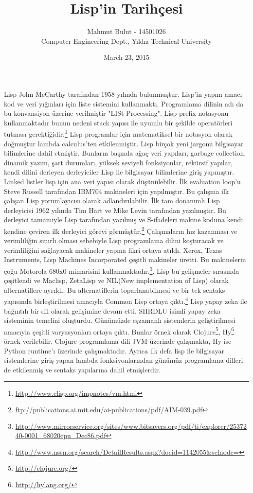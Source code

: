 \documentclass[12pt]{article}
\begin{document}
\title{ Lisp'in Tarihçesi }
\date{March 23, 2015}
\author{Mahmut Bulut - 14501026\\ Computer Engineering Dept., Yıldız Technical University}

\maketitle

Lisp John McCarthy tarafından 1958 yılında bulunmuştur. Lisp'in yapım amacı kod ve veri yığınları için liste sistemini kullanmaktı. Programlama dilinin adı da bu konvansiyon üzerine verilmiştir "LISt Processing". Lisp prefix notasyonu kullanmaktadır bunun nedeni stack yapısı ile uyumlu bir şekilde operatörleri tutması gerektiğidir.\footnote{\url{http://www.clisp.org/impnotes/vm.html}} Lisp programlar için matematiksel bir notasyon olarak doğmuştur lambda calculus'ten etkilenmiştir. Lisp birçok yeni jargonu bilgisayar bilimlerine dahil etmiştir. Bunların başında ağaç veri yapıları, garbage collection, dinamik yazım, şart durumları, yüksek seviyeli fonksiyonlar, rekürsif yapılar, kendi dilini derleyen derleyiciler Lisp ile bilgisayar bilimlerine giriş yapmıştır. Linked listler lisp için ana veri yapısı olarak düşünülebilir. İlk evaluation loop'u Steve Russell tarafından IBM704 makineleri için yapılmıştır. Bu çalışma ilk çalışan Lisp yorumlayıcısı olarak adlandırılabilir. İlk tam donanımlı Lisp derleyicisi 1962 yılında Tim Hart ve Mike Levin tarafından yazılmıştır. Bu derleyici tamamıyle Lisp tarafından yazılmış ve S-ifadeleri makine koduna kendi kendine çeviren ilk derleyici görevi görmüştür.\footnote{\url{ftp://publications.ai.mit.edu/ai-publications/pdf/AIM-039.pdf}} Çalışmaların hız kazanması ve verimliliğin sınırlı olması sebebiyle Lisp programlama dilini koşturacak ve verimliliğini sağlayacak makineler yapma fikri ortaya atıldı. Xerox, Texas Instruments, Lisp Machines Incorporated çeşitli makineler üretti. Bu makinelerin çoğu Motorola 680x0 mimarisini kullanmaktadır.\footnote{\url{http://www.mirrorservice.org/sites/www.bitsavers.org/pdf/ti/explorer/2537240-0001_68020cpu_Dec86.pdf}}. Lisp bu gelişmeler sırasında çeşitlendi ve Maclisp, ZetaLisp ve NIL(New implementation of Lisp) olarak alternatiflere ayrıldı. Bu alternatiflerin toparlanabilmesi ve bir tek sentaks yapısında birleştirilmesi amacıyla Common Lisp ortaya çıktı.\footnote{\url{http://www.nssn.org/search/DetailResults.aspx?docid=1142055&selnode=}} Lisp yapay zeka ile bağıntılı bir dil olarak gelişimine devam etti. SHRDLU isimli yapay zeka sisteminin temelini oluşturdu. Günümüzde eşzamanlı sistemlerin geliştirilmesi amacıyla çeşitli varyasyonları ortaya çıktı. Bunlar örnek olarak Clojure\footnote{\url{http://clojure.org/}}, Hy\footnote{\url{http://hylang.org/}} örnek verilebilir. Clojure programlama dili JVM üzerinde çalışmakta, Hy ise Python runtime'ı üzerinde çalışmaktadır. Ayrıca ilk defa lisp ile bilgisayar sistemlerine giriş yapan lambda fonksiyonlarından günümüz programlama dilleri de etkilenmiş ve sentaks yapılarına dahil etmişlerdir.
\end{document}
